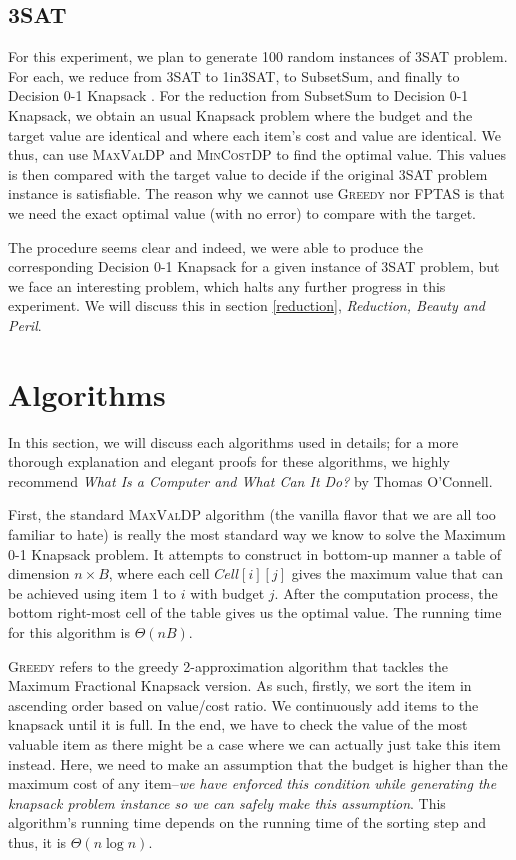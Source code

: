 \documentclass[12pt, oneside]{book}
\begin{document}
\section{3SAT}\label{sat}

For this experiment, we plan to generate 100 random instances of 3SAT
problem. For each, we reduce from 3SAT to 1in3SAT, to SubsetSum, and
finally to Decision 0-1 Knapsack \citep{oconnell2013}. For the reduction
from SubsetSum to Decision 0-1 Knapsack, we obtain an usual Knapsack
problem where the budget and the target value are identical and where
each item's cost and value are identical. We thus, can use
\textsc{MaxValDP} and \textsc{MinCostDP} to find the optimal value. This
values is then compared with the target value to decide if the original
3SAT problem instance is satisfiable. The reason why we cannot use
\textsc{Greedy} nor \textsc{FPTAS} is that we need the exact optimal
value (with no error) to compare with the target.

The procedure seems clear and indeed, we were able to produce the
corresponding Decision 0-1 Knapsack for a given instance of 3SAT
problem, but we face an interesting problem, which halts any further
progress in this experiment. We will discuss this in section
\ref{reduction}, \emph{Reduction, Beauty and Peril}.

\chapter{Algorithms}\label{algorithms}

In this section, we will discuss each algorithms used in details; for a
more thorough explanation and elegant proofs for these algorithms, we
highly recommend \emph{What Is a Computer and What Can It Do?} by Thomas
O'Connell.

First, the standard \textsc{MaxValDP} algorithm (the vanilla flavor that
we are all too familiar to hate) is really the most standard way we know
to solve the Maximum 0-1 Knapsack problem. It attempts to construct in
bottom-up manner a table of dimension \(n \times B\), where each cell
\(Cell[i][j]\) gives the maximum value that can be achieved using item 1
to \(i\) with budget \(j\). After the computation process, the bottom
right-most cell of the table gives us the optimal value. The running
time for this algorithm is \(\Theta(nB)\).

\textsc{Greedy} refers to the greedy 2-approximation algorithm that
tackles the Maximum Fractional Knapsack version. As such, firstly, we
sort the item in ascending order based on value/cost ratio. We
continuously add items to the knapsack until it is full. In the end, we
have to check the value of the most valuable item as there might be a
case where we can actually just take this item instead. Here, we need to
make an assumption that the budget is higher than the maximum cost of
any item--\emph{we have enforced this condition while generating the
knapsack problem instance so we can safely make this assumption}. This
algorithm's running time depends on the running time of the sorting step
and thus, it is \(\Theta(n\log{n})\).
\end{document}
